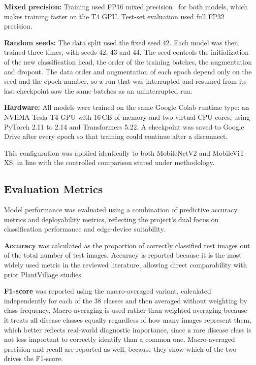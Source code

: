 \documentclass[conference]{IEEEtran}
\begin{document}
\textbf{Mixed precision:} Training used FP16 mixed precision~\cite{micikevicius2018mixed} for both models, which makes training faster on the T4 GPU. Test-set evaluation used full FP32 precision.

\textbf{Random seeds:} The data split used the fixed seed 42. Each model was then trained three times, with seeds 42, 43 and 44. The seed controls the initialization of the new classification head, the order of the training batches, the augmentation and dropout. The data order and augmentation of each epoch depend only on the seed and the epoch number, so a run that was interrupted and resumed from its last checkpoint saw the same batches as an uninterrupted run.

\textbf{Hardware:} All models were trained on the same Google Colab runtime type: an NVIDIA Tesla T4 GPU with 16\,GB of memory and two virtual CPU cores, using PyTorch 2.11 to 2.14 and Transformers 5.22. A checkpoint was saved to Google Drive after every epoch so that training could continue after a disconnect.

This configuration was applied identically to both MobileNetV2 and MobileViT-XS, in line with the controlled comparison stated under methodology.

\subsection{Evaluation Metrics}
\label{sec:metrics}

Model performance was evaluated using a combination of predictive accuracy metrics and deployability metrics, reflecting the project's dual focus on classification performance and edge-device suitability.

\textbf{Accuracy} was calculated as the proportion of correctly classified test images out of the total number of test images. Accuracy is reported because it is the most widely used metric in the reviewed literature, allowing direct comparability with prior PlantVillage studies.

\textbf{F1-score} was reported using the macro-averaged variant, calculated independently for each of the 38 classes and then averaged without weighting by class frequency. Macro-averaging is used rather than weighted averaging because it treats all disease classes equally regardless of how many images represent them, which better reflects real-world diagnostic importance, since a rare disease class is not less important to correctly identify than a common one. Macro-averaged precision and recall are reported as well, because they show which of the two drives the F1-score.
\end{document}
